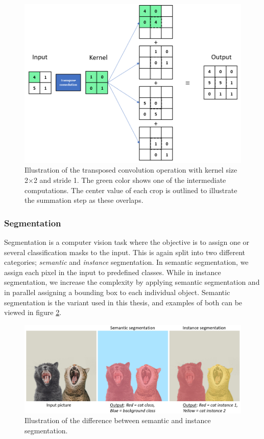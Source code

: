     \begin{figure}[H]
        \centering
        \includegraphics[scale=0.5]{figures/transpose_convolution.png}
        \caption[Transposed convolution]{Illustration of the transposed convolution operation with kernel size 2×2 and stride 1. The green color shows one of the intermediate computations. The center value of each crop is outlined to illustrate the summation step as these overlaps.}
      	\medskip 
        \label{transposed_conv_fig}
    \end{figure}
    
\subsubsection{Segmentation}
    Segmentation is a computer vision task where the objective is to assign one or several classification masks to the input\cite{He_2017_ICCV_segmentation}. This is again split into two different categories; \textit{semantic} and \textit{instance} segmentation. In semantic segmentation, we assign each pixel in the input to predefined classes. While in instance segmentation, we increase the complexity by applying semantic segmentation and in parallel assigning a bounding box to each individual object. Semantic segmentation is the variant used in this thesis, and examples of both can be viewed in figure \ref{segmentation_fig}.
    
    \begin{figure}[H]
        \centering
        \includegraphics[scale=0.4]{figures/segmentation.png}
        \caption[Difference between semantic and instance segmentation]{Illustration of the difference between semantic and instance segmentation.}
      	\medskip 
        \label{segmentation_fig}
    \end{figure}

    


        

    
    